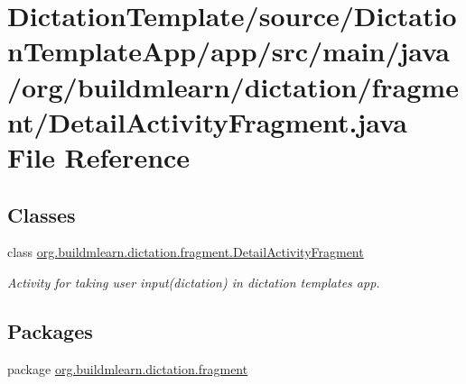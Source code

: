 \hypertarget{DictationTemplate_2source_2DictationTemplateApp_2app_2src_2main_2java_2org_2buildmlearn_2dictatid1c47e4a090d94dec80c4479897b3a2c}{}\section{Dictation\+Template/source/\+Dictation\+Template\+App/app/src/main/java/org/buildmlearn/dictation/fragment/\+Detail\+Activity\+Fragment.java File Reference}
\label{DictationTemplate_2source_2DictationTemplateApp_2app_2src_2main_2java_2org_2buildmlearn_2dictatid1c47e4a090d94dec80c4479897b3a2c}
\subsection*{Classes}
\begin{DoxyCompactItemize}
\item 
class \hyperlink{classorg_1_1buildmlearn_1_1dictation_1_1fragment_1_1DetailActivityFragment}{org.\+buildmlearn.\+dictation.\+fragment.\+Detail\+Activity\+Fragment}
\begin{DoxyCompactList}\small\item\em Activity for taking user input(dictation) in dictation template\textquotesingle{}s app. \end{DoxyCompactList}\end{DoxyCompactItemize}
\subsection*{Packages}
\begin{DoxyCompactItemize}
\item 
package \hyperlink{namespaceorg_1_1buildmlearn_1_1dictation_1_1fragment}{org.\+buildmlearn.\+dictation.\+fragment}
\end{DoxyCompactItemize}
